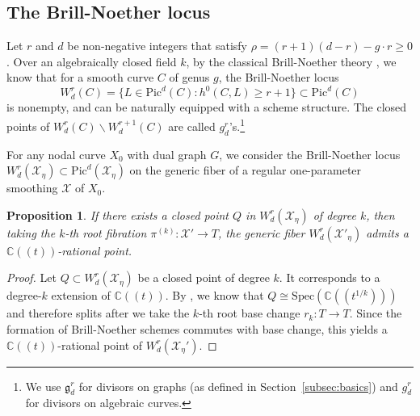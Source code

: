\documentclass[11pt]{amsart}
\newtheorem{proposition}{Proposition}
\newcommand{\cX}{\mathcal X}
\begin{document}


\subsection{The Brill-Noether locus}Let $r$ and $d$ be non-negative integers that satisfy $\rho=(r+1)(d-r)-g\cdot r\geq0$. Over an algebraically closed field $k$, by the classical Brill-Noether theory \cite[V.(1.1)]{MR770932}, we know that for a smooth curve $C$ of genus $g$, the Brill-Noether locus $$W_d^r(C)=\{L\in\mathrm{Pic}^d(C)\colon h^0(C,L)\geq r+1\}\subset\mathrm{Pic}^d(C)$$ is nonempty, and can be naturally equipped with a scheme structure. The closed points of $W_d^r(C)\backslash W_d^{r+1}(C)$ are called $g_d^r$'s.\footnote{We use $\mathfrak{g}_d^r$ for divisors on graphs (as defined in Section~\ref{subsec:basics}) and $g_d^r$ for divisors on algebraic curves.}  %

\medskip

For any nodal curve $X_0$ with dual graph $G$, we consider the Brill-Noether locus $W_d^r(\cX_\eta)\subset\mathrm{Pic}^d(\cX_{\eta})$ on the generic fiber of a regular one-parameter smoothing $\cX$ of $X_0$. 
\begin{proposition}\label{prop3}
 If there exists a closed point $Q$ in $W_d^r(\cX_\eta)$ of degree $k$, then taking the $k$-th root fibration $\pi^{(k)}\colon\mathcal{X}'\to T$, the generic fiber $W_d^r(\cX'_\eta)$ admits a $\mathbb{C}((t))$-rational point. 
\end{proposition}
\begin{proof}
Let $Q\subset W_d^r(\cX_\eta)$ be a closed point of degree $k$. It corresponds to a degree-$k$ extension of $\mathbb{C}((t))$. By \cite[Theorem 1.94]{MR2289519}, we know that $Q\cong\mathrm{Spec}(\mathbb{C}((t^{1/k})))$ and therefore splits after we take the $k$-th root base change $r_k\colon T\to T$. Since the formation of Brill-Noether schemes commutes with base change, this yields a $\mathbb{C}((t))$-rational point of $W_d^r(\cX_\eta')$.
\end{proof}

\end{document}
